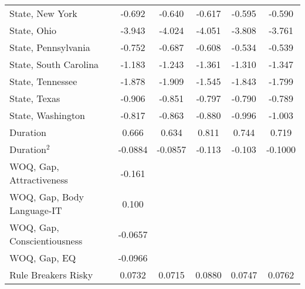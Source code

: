 {\begin{center}
{\begin{longtable}{l*{5}{c}}
\addlinespace
State, New York          &      -0.692\sym{**} &      -0.640\sym{*}  &      -0.617\sym{*}  &      -0.595\sym{*}  &      -0.590\sym{*}  \\
\addlinespace
State, Ohio              &      -3.943\sym{***}&      -4.024\sym{***}&      -4.051\sym{***}&      -3.808\sym{***}&      -3.761\sym{***}\\
\addlinespace
State, Pennsylvania      &      -0.752         &      -0.687         &      -0.608         &      -0.534         &      -0.539         \\
\addlinespace
State, South Carolina    &      -1.183         &      -1.243         &      -1.361         &      -1.310         &      -1.347         \\
\addlinespace
State, Tennessee         &      -1.878\sym{**} &      -1.909\sym{**} &      -1.545\sym{*}  &      -1.843\sym{**} &      -1.799\sym{**} \\
\addlinespace
State, Texas             &      -0.906\sym{**} &      -0.851\sym{**} &      -0.797\sym{**} &      -0.790\sym{**} &      -0.789\sym{**} \\
\addlinespace
State, Washington        &      -0.817         &      -0.863\sym{*}  &      -0.880\sym{*}  &      -0.996\sym{**} &      -1.003\sym{**} \\
\addlinespace
Duration                 &       0.666\sym{**} &       0.634\sym{**} &       0.811\sym{***}&       0.744\sym{**} &       0.719\sym{**} \\
\addlinespace
Duration$^2$               &     -0.0884\sym{**} &     -0.0857\sym{**} &      -0.113\sym{***}&      -0.103\sym{**} &     -0.1000\sym{**} \\
\addlinespace
WOQ, Gap, Attractiveness &      -0.161\sym{***}&                     &                     &                     &                     \\
\addlinespace
WOQ, Gap, Body Language-IT&       0.100         &                     &                     &                     &                     \\
\addlinespace
WOQ, Gap, Conscientiousness&     -0.0657         &                     &                     &                     &                     \\
\addlinespace
WOQ, Gap, EQ             &     -0.0966         &                     &                     &                     &                     \\
\addlinespace
Rule Breakers Risky      &      0.0732\sym{*}  &      0.0715\sym{*}  &      0.0880\sym{**} &      0.0747\sym{*}  &      0.0762\sym{*}  \\

\end{longtable}}
\end{center}}

